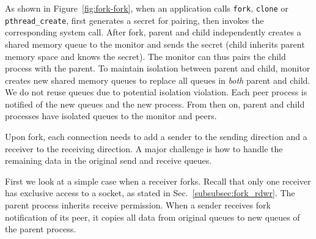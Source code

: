 As shown in Figure~\ref{fig:fork-fork}, when an application calls \texttt{fork}, \texttt{clone} or \texttt{pthread\_create}, \libipc{} first generates a secret for pairing, then invokes the corresponding system call. After fork, parent and child independently creates a shared memory queue to the monitor and sends the secret (child inherits parent memory space and knows the secret). The monitor can thus pairs the child process with the parent. 
To maintain isolation between parent and child, monitor creates new shared memory queues to replace all queues in \emph{both} parent and child. We do not reuse queues due to potential isolation violation. %
Each peer process is notified of the new queues and the new process. From then on, parent and child processes have isolated queues to the monitor and peers.

Upon fork, each connection needs to add a sender to the sending direction and a receiver to the receiving direction. A major challenge is how to handle the remaining data in the original send and receive queues.



First we look at a simple case when a receiver forks. Recall that only one receiver has exclusive access to a socket, as stated in Sec.~\ref{subsubsec:fork_rdwr}. The parent process inherits receive permission. When a sender receives fork notification of its peer, it copies all data from original queues to new queues of the parent process.

